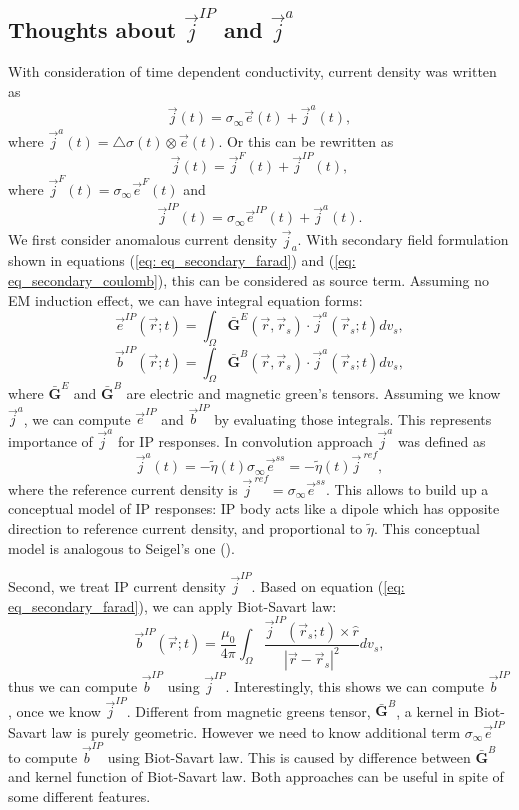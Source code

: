 \documentclass[a4paper, 11pt]{article}
\newcommand{\siginf}{\sigma_\infty}
\newcommand{\dsig}{\triangle\sigma}
\renewcommand {\j}  { {\vec j} }
\renewcommand {\b}  { {\vec b} }
\newcommand {\e}  { {\vec e} }
\newcommand{\peta}{\tilde{\eta}}
\begin{document}
\subsection{Thoughts about $\j^{IP}$ and $\j^a$}
With consideration of time dependent conductivity, current density was written as
\begin{eqnarray*}
    \j(t) = \siginf\e(t)+\j^a(t),
\end{eqnarray*}
where $\j^a(t)=\dsig(t)\otimes\e(t)$. Or this can be rewritten as
\begin{equation*}
    \j(t) = \j^{F}(t) + \j^{IP}(t),
\end{equation*}
where $\j^{F}(t)=\siginf\e^{F}(t)$ and
\begin{eqnarray}
		\j^{IP}(t) = \siginf\e^{IP}(t) + \j^a(t).
        \label{eq: jip_with_ja}
\end{eqnarray}
We first consider anomalous current density $\j_a$. With secondary field formulation shown in equations (\ref{eq: eq_secondary_farad}) and (\ref{eq: eq_secondary_coulomb}), this can be considered as source term. Assuming no EM induction effect, we can have integral equation forms:
\begin{equation}
    \e^{IP}(\vec{r}; t) = \int_{\Omega} \bar{\mathbf{G}}^{E}(\vec{r}, \vec{r}_s)\cdot\j^a(\vec{r}_s; t) dv_s,
\end{equation}
\begin{equation}
    \b^{IP}(\vec{r}; t) = \int_{\Omega} \bar{\mathbf{G}}^{B}(\vec{r}, \vec{r}_s)\cdot\j^a(\vec{r}_s; t) dv_s,
\end{equation}
where $\bar{\mathbf{G}}^{E}$ and $\bar{\mathbf{G}}^{B}$ are electric and magnetic green's tensors. Assuming we know $\j^a$, we can compute $\e^{IP}$ and $\b^{IP}$ by evaluating those integrals. This represents importance of  $\j^a$ for IP responses. In convolution approach $\j^a$ was defined as
\begin{equation}
    \j^a(t) = -\peta(t)\siginf\e^{ss}=-\peta(t)\j^{\ ref},
\end{equation}
where the reference current density is $\j^{\ ref} = \siginf\e^{ss}$.
This allows to build up a conceptual model of IP responses: IP body acts like a dipole which has opposite direction to reference current density, and proportional to $\peta$. This conceptual model is analogous to Seigel's one (\cite{seigel1959}).

Second, we treat IP current density $\j^{IP}$. Based on equation (\ref{eq: eq_secondary_farad}), we can apply Biot-Savart law:
\begin{equation}
  \b^{IP}(\vec{r}; t) = \frac{\mu_0}{4\pi}\int_{\Omega}  \frac{\j^{IP}(\vec{r}_s; t)\times\hat{r}}{|\vec{r}-\vec{r}_s|^2}dv_s,
\end{equation}
thus we can compute $\b^{IP}$ using $\j^{IP}$. Interestingly, this shows we can compute $\b^{IP}$, once we know $\j^{IP}$. Different from magnetic greens tensor, $\bar{\mathbf{G}}^B$, a kernel in Biot-Savart law is purely geometric. However we need to know additional term $\siginf\e^{IP}$ to compute $\b^{IP}$ using Biot-Savart law. This is caused by difference between $\bar{\mathbf{G}}^B$ and kernel function of Biot-Savart law. Both approaches can be useful in spite of some different features.
\end{document}
